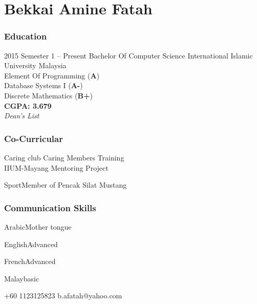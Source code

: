 \documentclass[11pt]{tccv}
\begin{document}
  
\part{Bekkai Amine Fatah}

\section{Education}

\begin{eventlist}

\item{2015 Semester 1 -- Present}
     {Bachelor Of Computer Science}
     {\large{International Islamic University Malaysia}}\\
     \small {Element Of Programming (\textbf{A})}\\
     \small{Database Systems I (\textbf{A-})}\\
     \small{Discrete Mathematics (\textbf{B+})}\\
     \textbf{CGPA: 3.679}\\
     \textit{Dean's List}
\end{eventlist}




\section{Co-Curricular}

\begin{factlist}
	\item{Caring club}
	{Caring Members Training\\
	 IIUM-Mayang Mentoring Project}
	
	\item{Sport}{Member of Pencak Silat Mustang}
\end{factlist}


\section{Communication Skills}

\begin{factlist}
	\item{Arabic}{Mother tongue}
	\item{English}{Advanced}
	\item{French}{Advanced}
	\item{Malay}{basic}
\end{factlist}


{+60 1123125823}
{b.afatah@yahoo.com}
\end{document}
